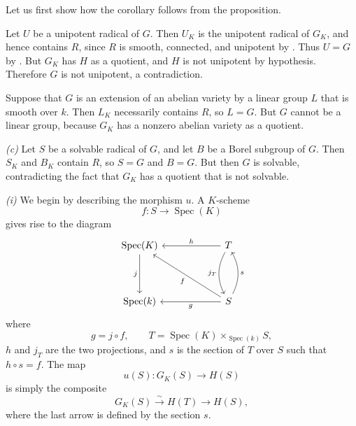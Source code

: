 
Let us first show how the corollary follows from the proposition.

\smallskip
\noindent\textit{} Let \(U\) be a unipotent radical of \(G\).
Then \(U_K\) is the unipotent radical of \(G_K\), and hence
contains \(R\), since \(R\) is smooth, connected, and unipotent
by .  Thus \(U=G\) by .  But \(G_K\) has \(H\) as a
quotient, and \(H\) is not unipotent by hypothesis.  Therefore
\(G\) is not unipotent, a contradiction.

\smallskip
\noindent\textit{} Suppose that \(G\) is an extension of an
abelian variety by a linear group \(L\) that is smooth over
\(k\).  Then \(L_K\) necessarily contains \(R\), so \(L=G\).
But \(G\) cannot be a linear group, because \(G_K\) has a nonzero
abelian variety as a quotient.

\smallskip
\noindent\textit{(c)} Let \(S\) be a solvable radical of \(G\),
and let \(B\) be a Borel subgroup of \(G\).  Then \(S_K\) and
\(B_K\) contain \(R\), so \(S=G\) and \(B=G\).  But then \(G\)
is solvable, contradicting the fact that \(G_K\) has a quotient
that is not solvable.

\textit{(i)} We begin by describing the morphism \(u\).  A
\(K\)-scheme
\[
  f:S\longrightarrow\operatorname{Spec}(K)
\]
gives rise to the diagram
\[
\begin{tikzcd}[column sep=6.0em,row sep=4.0em]
  \operatorname{Spec}(K)
    \arrow[d,"j"'] &
  T
    \arrow[l,"h"']
    \arrow[d,bend right=28,"j_T"'] \\
  \operatorname{Spec}(k) &
  S
    \arrow[l,"g"]
    \arrow[ul,"f"]
    \arrow[u,bend right=28,"s"']
\end{tikzcd}
\]
where
\[
  g=j\circ f,\qquad
  T=\operatorname{Spec}(K)\times_{\operatorname{Spec}(k)}S,
\]
\(h\) and \(j_T\) are the two projections, and \(s\) is the
section of \(T\) over \(S\) such that \(h\circ s=f\).  The map
\[
  u(S):G_K(S)\longrightarrow H(S)
\]
is simply the composite
\[
  G_K(S)\xrightarrow{\sim}H(T)\longrightarrow H(S),
\]
where the last arrow is defined by the section \(s\).

